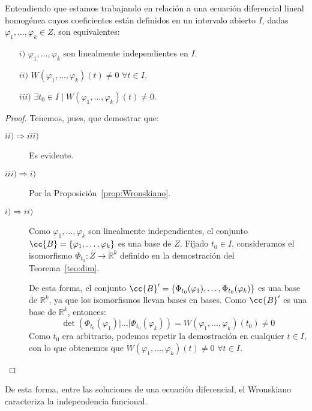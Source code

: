 \begin{prop}
    Entendiendo que estamos trabajando en relación a una ecuación diferencial lineal homogénea cuyos coeficientes están definidos en un intervalo abierto $I$, dadas $\varphi_1,\ldots,\varphi_k\in Z$, son equivalentes:
    \begin{enumerate}
        \item[$i)$] $\varphi_1,\ldots,\varphi_k$ son linealmente independientes en $I$.
        \item[$ii)$] $W(\varphi_1,\ldots,\varphi_k)(t) \neq 0$ $\forall t\in I$.
        \item[$iii)$] $\exists t_0\in I \mid W(\varphi_1,\ldots,\varphi_k)(t) \neq 0$.
    \end{enumerate}
    \begin{proof}
        Tenemos, pues, que demostrar que:
        \begin{description}
            \item [$ii)\Rightarrow iii)$] Es evidente.
            \item [$iii) \Rightarrow i)$] Por la Proposición~\ref{prop:Wronskiano}.
            \item [$i) \Rightarrow ii)$] Como $\varphi_1,\ldots,\varphi_k$ son linealmente independientes, el conjunto $\cc{B}=\{\varphi_1,\ldots,\varphi_k\}$ es una base de $Z$. Fijado $t_0\in I$, consideramos el isomorfismo $\Phi_{t_0}:Z\rightarrow\mathbb{R}^k$ definido en la demostración del Teorema~\ref{teo:dim}.

                De esta forma, el conjunto $\cc{B}'=\{\Phi_{t_0}(\varphi_1),\ldots,\Phi_{t_0}(\varphi_k)\}$ es una base de $\mathbb{R}^k$, ya que los isomorfismos llevan bases en bases.
                Como $\cc{B}'$ es una base de $\mathbb{R}^k$, entonces:
                \begin{equation*}
                    \det(\Phi_{t_0}(\varphi_1)|\ldots|\Phi_{t_0}(\varphi_k)) = W(\varphi_1,\ldots,\varphi_k)(t_0) \neq 0
                \end{equation*}
                Como $t_0$ era arbitrario, podemos repetir la demostración en cualquier $t\in I$, con lo que obtenemos que $W(\varphi_1,\ldots,\varphi_k)(t) \neq 0$ $\forall t\in I$.
        \end{description}
    \end{proof}
\end{prop}
De esta forma, entre las soluciones de una ecuación diferencial, el Wronskiano caracteriza la independencia funcional.

